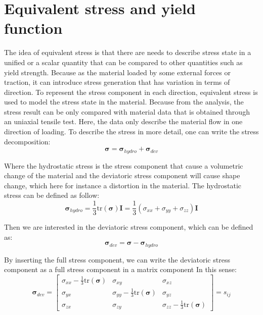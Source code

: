 \documentclass[12pt]{article}
\begin{document}
\section{Equivalent stress and yield function}
\hspace{2em}
The idea of equivalent stress is that there are needs to describe stress state in a unified or a scalar quantity
that can be compared to other quantities such as yield strength. Because as the material loaded by some external forces or traction,
it can introduce stress generation that has variation in terms of direction. To represent the stress component in each
direction, equivalent stress is used to model the stress state in the material. Because from the analysis, the stress result
can be only compared with material data that is obtained through an uniaxial tensile test. Here, the data only describe
the material flow in one direction of loading. To describe the stress in more detail, one can write the stress decomposition:
\begin{equation}
\boldsymbol{\sigma} = \boldsymbol{\sigma}_{hydro} + \boldsymbol{\sigma}_{dev}
\end{equation}

Where the hydrostatic stress is the stress component that cause a volumetric change of the material and 
the deviatoric stress component will cause shape change, which here for instance a distortion in the material. The
hydrostatic stress can be defined as follow:
\begin{equation}
\boldsymbol{\sigma}_{hydro} = \frac{1}{3} \text{tr}(\boldsymbol{\sigma}) \boldsymbol{I} = \frac{1}{3} \left( \sigma_{xx} + \sigma_{yy} + \sigma_{zz} \right) \boldsymbol{I}
\end{equation}

Then we are interested in the deviatoric stress component, which can be defined as:
\begin{equation}
\boldsymbol{\sigma}_{dev} = \boldsymbol{\sigma} - \boldsymbol{\sigma}_{hydro}
\end{equation}

By inserting the full stress component, we can write the deviatoric stress component as a full stress component in a matrix component
In this sense:
\begin{equation}
\boldsymbol{\sigma}_{dev} =
    \begin{bmatrix}
    \sigma_{xx} - \frac{1}{3}\text{tr}(\boldsymbol{\sigma}) & \sigma_{xy} & \sigma_{xz} \\
    \sigma_{yx} & \sigma_{yy} - \frac{1}{3}\text{tr}(\boldsymbol{\sigma}) & \sigma_{yz} \\
    \sigma_{zx} & \sigma_{zy} & \sigma_{zz} - \frac{1}{3}\text{tr}(\boldsymbol{\sigma})
    \label{eq:deviatoric_stress}
    \end{bmatrix}
    = s_{ij}
\end{equation}
\end{document}
